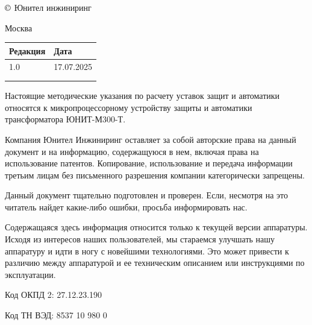 \pagestyle{fancy}
\fancyhf{}
\renewcommand{\headrulewidth}{1pt}
\lhead{\color{black}{ЮТКБ.656122.609 Т.РР1 Редакция 1.0 от 17.07.2025}}
\rfoot{{\thepage}}
\renewcommand{\footrulewidth}{1pt}


\pagecolor{white}

\begin{flushleft}
\noindent
$\copyright$
\the\year{}
Юнител инжиниринг

\vskip 3mm
Москва
\vskip 8mm

\setlength{\extrarowheight}{0.4cm} %
\begin{longtable}[l]{|>{\centering}m{4cm}|>{\centering\arraybackslash}m{4cm}|}
    \hline
    \textcolor{unigray}{Редакция} & \textcolor{unigray}{Дата} \\
    \hline
    \textcolor{unigray}{1.0} & \textcolor{unigray}{17.07.2025} \\
    \hline
     &  \\
    \hline
     &  \\
    \hline
\end{longtable}

\vskip 50mm
\noindent
Настоящие методические указания по расчету уставок защит и автоматики относятся к микропроцессорному устройству защиты и автоматики трансформатора ЮНИТ-М300-Т.

\vskip 10mm
Компания Юнител Инжиниринг оставляет за собой авторские права на данный документ и на информацию, содержащуюся в нем, включая права на использование патентов. Копирование, использование и передача информации третьим лицам без письменного разрешения компании категорически запрещены.

\vskip 10mm
Данный документ тщательно подготовлен и проверен. Если, несмотря на это читатель найдет какие-либо ошибки, просьба информировать нас.

\vskip 10mm
Содержащаяся здесь информация относится только к текущей версии аппаратуры. Исходя из интересов наших пользователей, мы стараемся улучшать нашу аппаратуру и идти в ногу с новейшими технологиями. Это может привести к различию между аппаратурой и ее техническим описанием или инструкциями по эксплуатации.

\vskip 10mm
Код ОКПД 2: 27.12.23.190

\vskip 5mm
Код ТН ВЭД: 8537 10 980 0

\end{flushleft}